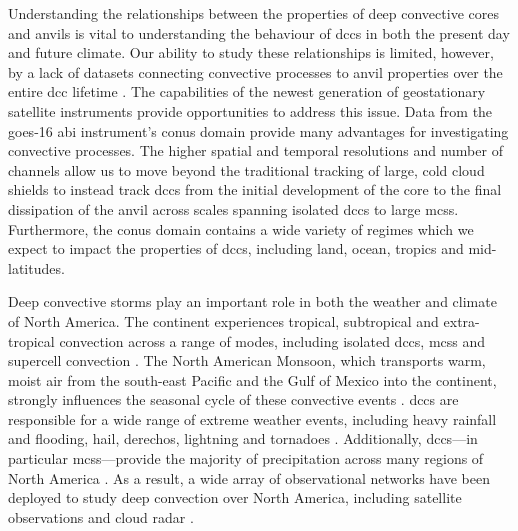 Understanding the relationships between the properties of deep convective cores and anvils is vital to understanding the behaviour of \acrshort{dcc}s in both the present day and future climate.
Our ability to study these relationships is limited, however, by a lack of datasets connecting convective processes to anvil properties over the entire \acrshort{dcc} lifetime \citep{gasparini_opinion_2023}.
The capabilities of the newest generation of geostationary satellite instruments provide opportunities to address this issue.
Data from the \acrshort{goes}-16 \acrshort{abi} instrument's \acrshort{conus} domain provide many advantages for investigating convective processes.
The higher spatial and temporal resolutions and number of channels allow us to move beyond the traditional tracking of large, cold cloud shields to instead track \acrshort{dcc}s from the initial development of the core to the final dissipation of the anvil across scales spanning isolated \acrshort{dcc}s to large \acrshort{mcs}s.
Furthermore, the \acrshort{conus} domain contains a wide variety of regimes which we expect to impact the properties of \acrshort{dcc}s, including land, ocean, tropics and mid-latitudes.

Deep convective storms play an important role in both the weather and climate of North America.
The continent experiences tropical, subtropical and extra-tropical convection across a range of modes, including isolated \acrshort{dcc}s, \acrshort{mcs}s and supercell convection \citep{brooks_century_2019}.
The North American Monsoon, which transports warm, moist air from the south-east Pacific and the Gulf of Mexico into the continent, strongly influences the seasonal cycle of these convective events \citep{adams_north_1997, higgins_intercomparison_2001}.
\acrshort{dcc}s are responsible for a wide range of extreme weather events, including heavy rainfall and flooding, hail, derechos, lightning and tornadoes \citep{westra_future_2014, houze_chapter_2014, williams_radar_1992, bruning_theory_2013, punge_hail_2016, matsudo_severe_2011}.
Additionally, \acrshort{dcc}s---in particular \acrshort{mcs}s---provide the majority of precipitation across many regions of North America \citep{feng_spatiotemporal_2019, li_high-resolution_2021}.
As a result, a wide array of observational networks have been deployed to study deep convection over North America, including satellite observations and cloud radar \citep{brooks_century_2019}.

